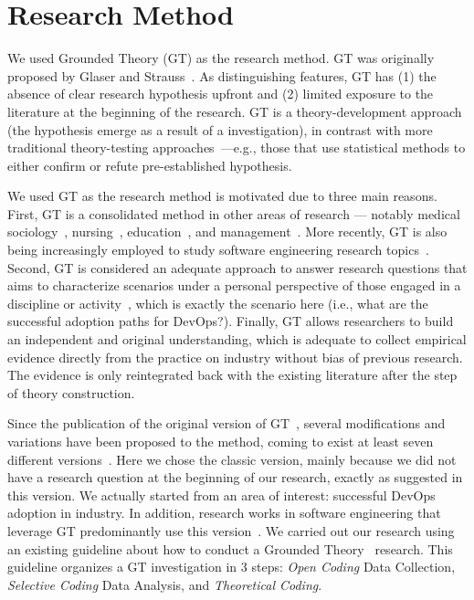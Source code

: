 \section{Research Method} \label{sec:research_method}


We used Grounded Theory (GT) as the research method. GT was
originally proposed by Glaser and Strauss~\cite{glase1967discovery}.
As distinguishing features, GT has (1) the absence of clear research hypothesis upfront
and (2) limited exposure to the literature at the beginning of the research. GT
is a theory-development approach (the hypothesis emerge as a result of
a investigation), in contrast with more traditional
theory-testing approaches~\cite{coleman2007using}---e.g., those that
use statistical methods to either confirm or refute pre-established hypothesis.

We used GT as the research method is motivated due to three main reasons. First, GT is a consolidated
method in other areas of research --- notably medical
sociology~\cite{gt_medical_sociology}, nursing~\cite{barnsteiner2002using}, education~\cite{gt_education}, 
and management~\cite{gt_management}. More recently, GT is also being increasingly employed
to study software engineering research topics~\cite{hoda2017becoming,stol2016grounded,adolph2011using}. Second,
GT is considered an adequate approach to answer research questions that aims to
characterize scenarios under a personal perspective of those
engaged in a discipline or activity~\cite{barnsteiner2002using},
which is exactly the scenario here (i.e., what are the successful adoption paths for DevOps?). Finally,
GT allows researchers to build an independent and original understanding,
which is adequate to collect empirical evidence directly from the
practice on industry without bias of previous research. The evidence
is only reintegrated back with the existing literature after the step of
theory construction.

Since the publication of the original version of GT~\cite{glase1967discovery},
several modifications and variations have been proposed to the method, coming to
exist at least seven different versions~\cite{denzin2007grounded}.
Here we chose the classic version, mainly because we did not have a research
question at the beginning of our research, exactly as suggested in this
version. We actually started from an area of interest: successful DevOps adoption
in industry. In addition, research works in software engineering that leverage GT
predominantly use this version~\cite{stol2016grounded}.
We carried out our research using an existing
guideline about how to conduct a
Grounded Theory~\cite{adolph2011using} research. This guideline organizes
a GT investigation in 3 steps: \emph{Open Coding} Data Collection,
\emph{Selective Coding} Data Analysis, and \emph{Theoretical Coding}.

